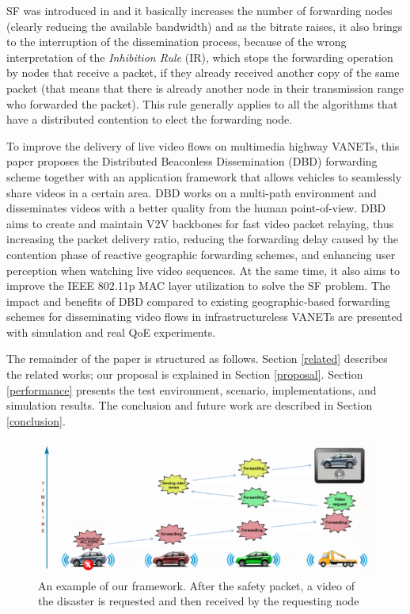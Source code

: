 \documentclass{sig-alternate-2013}
\begin{document}
SF was introduced in \cite{VTCDeFelice} and it basically increases the number of forwarding nodes (clearly reducing the available bandwidth) and as the bitrate raises, it also brings to the interruption of the dissemination process, because of the wrong interpretation of the \textit{Inhibition Rule} (IR), which stops the forwarding operation by nodes that receive a packet, if they already received another copy of the same packet (that means that there is already another node in their transmission range who forwarded the packet). This rule generally applies to all the algorithms that have a distributed contention to elect the forwarding node.

To improve the delivery of live video flows on multimedia highway VANETs, this paper proposes the Distributed Beaconless Dissemination (DBD) forwarding scheme  together with an application framework that allows vehicles to seamlessly share videos in a certain area. DBD works on a multi-path environment and disseminates videos with a better quality from the human point-of-view. DBD aims to create and maintain V2V backbones for fast video packet relaying, thus increasing the packet delivery ratio, reducing the forwarding delay caused by the contention phase of reactive geographic forwarding schemes, and enhancing user perception when watching live video sequences. At the same time, it also aims to improve the IEEE 802.11p MAC layer utilization to solve the SF problem. The impact and benefits of DBD compared to existing geographic-based forwarding schemes for disseminating video flows in infrastructureless VANETs are presented with simulation and real QoE experiments.

The remainder of the paper is structured as follows. Section \ref{related} describes the related works; our proposal is explained in Section \ref{proposal}. Section \ref{performance} presents the test environment, scenario, implementations, and simulation results. The conclusion and future work are described in Section \ref{conclusion}.


\begin{figure}[!thb]
\begin{center}
\includegraphics[width=1.5\columnwidth]{./fig/NewBigPicture.eps}
\caption{An example of our framework. After the safety packet, a video of the disaster is requested and then received by the requesting node}
\label{fig:bigpicture}
\end{center}
\end{figure}
\end{document}
